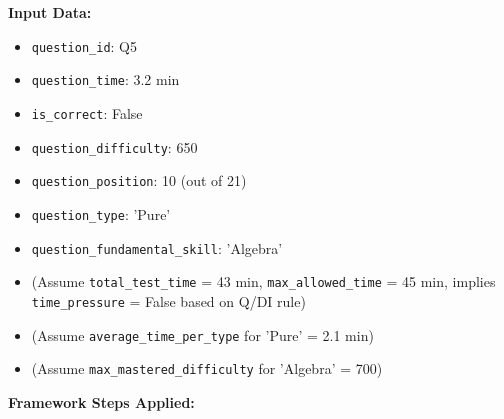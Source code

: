 \documentclass{article}
\begin{document}
\textbf{Input Data:}
\begin{itemize}
    \item \texttt{question\_id}: Q5
    \item \texttt{question\_time}: 3.2 min
    \item \texttt{is\_correct}: False
    \item \texttt{question\_difficulty}: 650
    \item \texttt{question\_position}: 10 (out of 21)
    \item \texttt{question\_type}: 'Pure'
    \item \texttt{question\_fundamental\_skill}: 'Algebra'
    \item (Assume \texttt{total\_test\_time} = 43 min, \texttt{max\_allowed\_time} = 45 min, implies \texttt{time\_pressure} = False based on Q/DI rule)
    \item (Assume \texttt{average\_time\_per\_type} for 'Pure' = 2.1 min)
    \item (Assume \texttt{max\_mastered\_difficulty} for 'Algebra' = 700)
\end{itemize}
\newpage
\textbf{Framework Steps Applied:}
\end{document}
